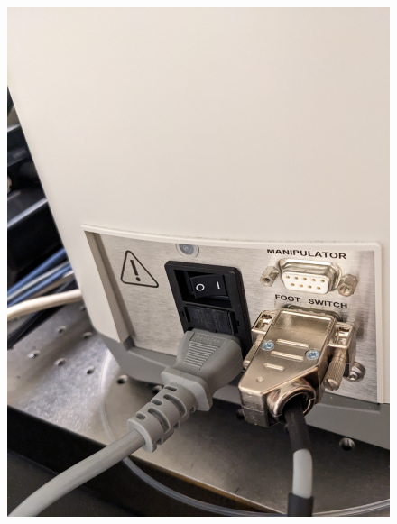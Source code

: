\documentclass[
  letterpaper,
  DIV=11,
  numbers=noendperiod]{scrartcl}
\begin{document}
\begin{figure}
\begin{minipage}[t]{0.33\linewidth}
{{\includegraphics{micro_photos/included/microinjector_ON_button.jpg}

}

}

\end{minipage}%
%
\begin{minipage}[t]{0.33\linewidth}

{\centering 

\raisebox{-\height}{

}}
\end{minipage}
\end{figure}
\end{document}
